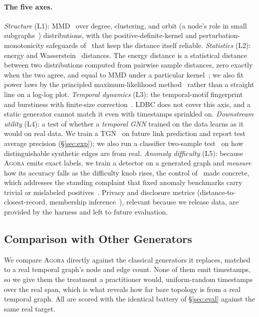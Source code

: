 \documentclass[sigconf,review,anonymous]{acmart}
\newcommand{\sys}{\textsc{Agora}\xspace}
\begin{document}
\paragraph{The five axes.}
\emph{Structure} (L1): MMD~\cite{gretton2012mmd} over degree, clustering, and orbit
(a node's role in small subgraphs~\cite{hocevar2014orca}) distributions, with the
positive-definite-kernel and perturbation-monotonicity safeguards
of~\cite{obray2022evalmetrics,you2018graphrnn} that keep the distance itself reliable.
\emph{Statistics} (L2): energy and Wasserstein~\cite{villani2009ot} distances. The
energy distance is a statistical distance between two distributions computed from
pairwise sample distances, zero exactly when the two agree, and equal to MMD under a
particular kernel~\cite{sejdinovic2013energy}; we also fit power laws by the principled
maximum-likelihood method~\cite{clauset2009powerlaw} rather than a straight line on a
log-log plot. \emph{Temporal dynamics} (L3): the temporal-motif
fingerprint~\cite{paranjape2017motifs} and burstiness with finite-size
correction~\cite{goh2008burstiness,kim2016burstiness}. LDBC does not cover this axis,
and a static generator cannot match it even with timestamps sprinkled on.
\emph{Downstream utility} (L4): a test of whether a
\emph{temporal GNN} trained on the data learns as it would on real data. We train a
TGN~\cite{rossi2020tgn} on future link prediction and report test average precision
(\S\ref{sec:exp}); we also run a classifier two-sample test~\cite{lopezpaz2017c2st} on
how distinguishable synthetic edges are from real. \emph{Anomaly difficulty} (L5):
because \sys{} emits exact labels, we train a detector on a generated graph and
\emph{measure} how its accuracy falls as the difficulty knob rises, the control
of~\cite{emmott2013anomaly} made concrete, which addresses the standing complaint that
fixed anomaly benchmarks carry trivial or mislabeled
positives~\cite{wu2021flawed,han2022adbench}. Privacy and disclosure metrics
(distance-to-closest-record, membership inference~\cite{vanbreugel2023domias}), relevant
because we release data, are provided by the harness and left to future evaluation.

\subsection{Comparison with Other Generators}
\label{sec:compare}
We compare \sys{} directly against the classical generators it replaces, matched to a
real temporal graph's node and edge count. None of them emit timestamps, so we give them
the treatment a practitioner would, uniform-random timestamps over the real span, which
is what reveals how far bare topology is from a real temporal graph. All are scored with
the identical battery of \S\ref{sec:eval} against the same real target.
\end{document}
